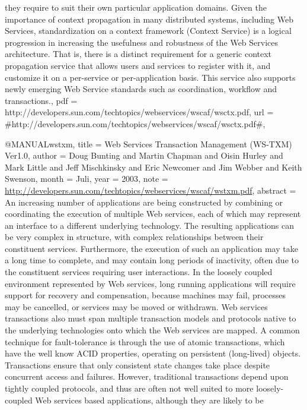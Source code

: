 {{they require
	to suit their own particular application domains. Given
the importance
	of context propagation in many distributed systems,
including Web
	Services, standardization on a context framework (Context
Service)
	is a logical progression in increasing the usefulness and
robustness
	of the Web Services architecture. That is, there is a distinct
requirement
	for a generic context propagation service that allows users and
services
	to register with it, and customize it on a per-service or
per-application
	basis. This service also supports newly emerging Web
Service standards
	such as coordination, workflow and transactions.},
  pdf = {http://developers.sun.com/techtopics/webservices/wscaf/wsctx.pdf},
  url = {#http://developers.sun.com/techtopics/webservices/wscaf/wsctx.pdf#},
}

@MANUAL{wstxm,
  title = {{Web Services Transaction Management (WS-TXM) Ver1.0}},
  author = {Doug Bunting and Martin Chapman and Oisin Hurley and Mark Little
	and Jeff Mischkinsky and Eric Newcomer and Jim Webber and Keith Swenson},
  month = {Juli},
  year = {2003},
  note = {\url{http://developers.sun.com/techtopics/webservices/wscaf/wstxm.pdf}},
  abstract = {An increasing number of applications
are being constructed by combining
	or coordinating the execution of
multiple Web services, each of which
	may represent an interface to
a different underlying technology.
	The resulting applications can
be very complex in structure, with
	complex relationships between
their constituent services. Furthermore,
	the execution of such an
application may take a long time to complete,
	and may contain long
periods of inactivity, often due to the constituent
	services requiring
user interactions. In the loosely coupled environment
	represented by
Web services, long running applications will require
	support for
recovery and compensation, because machines may fail,
	processes may
be cancelled, or services may be moved or withdrawn.
	Web services
transactions also must span multiple transaction models
	and protocols
native to the underlying technologies onto which the
	Web services are
mapped. A common technique for fault-tolerance is
	through the use
of atomic transactions, which have the well know
	ACID properties,
operating on persistent (long-lived) objects. Transactions
	ensure
that only consistent state changes take place despite concurrent
access
	and failures. However, traditional transactions depend upon
tightly
	coupled protocols, and thus are often not well suited to more
loosely-coupled
	Web services based applications, although they are likely to be
}}
